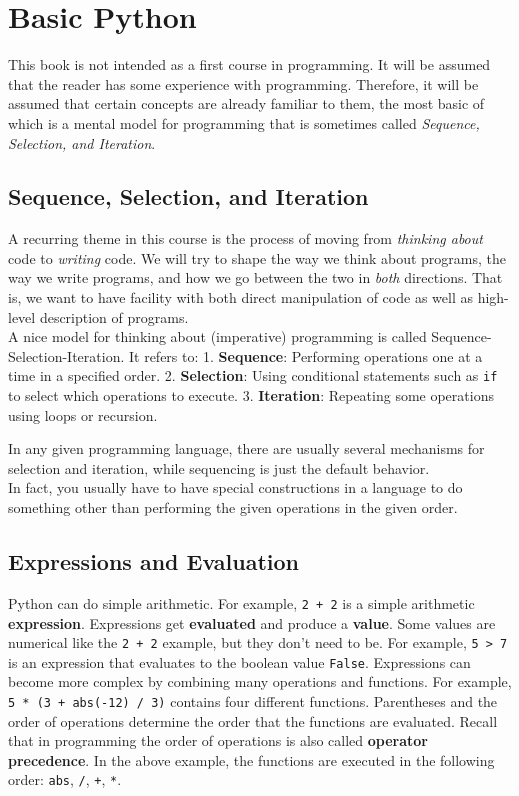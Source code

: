 \chapter{Basic Python}


This book is not intended as a first course in programming.
It will be assumed that the reader has some experience with programming.
Therefore, it will be assumed that certain concepts are already familiar to them, the most basic of which is a mental model for programming that is sometimes called \emph{Sequence, Selection, and Iteration}.

\section{Sequence, Selection, and Iteration}


A recurring theme in this course is the process of moving from \emph{thinking about} code to \emph{writing} code.  We will try to shape the way we think about programs, the way we write programs, and how we go between the two in \emph{both} directions.  That is, we want to have facility with both direct manipulation of code as well as high-level description of programs.\\
A nice model for thinking about (imperative) programming is called Sequence-Selection-Iteration.  It refers to:
1. \textbf{Sequence}: Performing operations one at a time in a specified order.
2. \textbf{Selection}: Using conditional statements such as \texttt{if} to select which operations to execute.
3. \textbf{Iteration}: Repeating some operations using loops or recursion.


In any given programming language, there are usually several mechanisms for selection and iteration, while sequencing is just the default behavior.\\
In fact, you usually have to have special constructions in a language to do something other than performing the given operations in the given order.

\section{Expressions and Evaluation}


Python can do simple arithmetic.  For example, \texttt{2 + 2} is a simple arithmetic \textbf{expression}.
Expressions get \textbf{evaluated} and produce a \textbf{value}.  Some values are numerical like the \texttt{2 + 2} example, but they don’t need to be.
For example, \texttt{5 > 7} is an expression that evaluates to the boolean value \texttt{False}.
Expressions can become more complex by combining many operations and functions.
For example, \texttt{5 * (3 + abs(-12) / 3)} contains four different functions.  Parentheses and the order of operations determine the order that the functions are evaluated.  Recall that in programming the order of operations is also called \textbf{operator precedence}.  In the above example, the functions are executed in the following order: \texttt{abs}, \texttt{/},  \texttt{+}, \texttt{*}.

